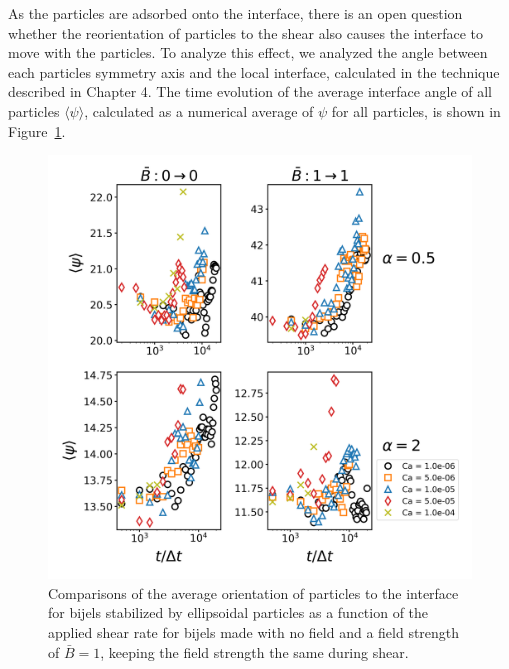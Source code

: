 As the particles are adsorbed onto the interface, there is an open question whether the reorientation of particles to the shear also causes the interface to move with the
particles. To analyze this effect, we analyzed the angle between each particles symmetry axis and the local interface, calculated in the technique described in Chapter 4.
The time evolution of the average interface angle of all particles $\langle \psi \rangle$, calculated as a numerical average of $\psi$ for all particles, is shown in 
Figure~\ref{fig:interface_angle_shear}.

\begin{figure} 
    \centering 
    \includegraphics[scale=0.5]{../figures/results/paper3/psi-time_compare-specific.png} 
    \caption{Comparisons of the average orientation of particles to the interface for bijels stabilized by
             ellipsoidal particles as a function of the applied shear rate for bijels made with no field and a field strength of $\bar{B} = 1$,
             keeping the field strength the same during shear.} 
    \label{fig:interface_angle_shear} 
\end{figure}

